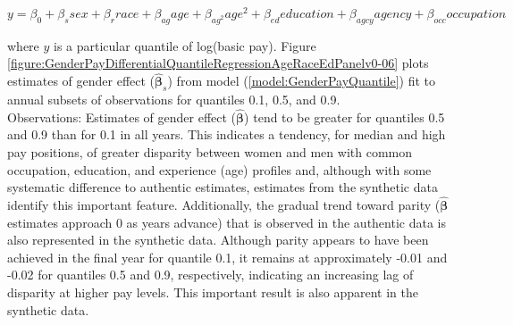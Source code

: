 \documentclass[10pt, letterpaper]{article}
\newcommand{\mest}[1]{\hat{\bm{#1}}}
\begin{document}
\begin{spacing}{1.0}
\begin{equation} y=\beta_0+\beta_ssex+\beta_rrace+\beta_{ag}age+\beta_{ag^2}age^2+\beta_{ed}education+\beta_{agcy}agency+\beta_{occ}occupation
\label{model:GenderPayQuantile}
\end{equation}

where $y$ is a particular quantile of log(basic pay).  Figure \ref{figure:GenderPayDifferentialQuantileRegressionAgeRaceEdPanelv0-06} plots estimates of gender effect ($\mest{\beta}_s$) from model (\ref{model:GenderPayQuantile}) fit to annual subsets of observations for quantiles 0.1, 0.5, and 0.9.\\

Observations:  Estimates of gender effect ($\mest{\beta}$) tend to be greater for quantiles 0.5 and 0.9 than for 0.1 in all years.  This indicates a tendency, for median and high pay positions, of greater disparity between women and men with common occupation, education, and experience (age) profiles and, although with some systematic difference to authentic estimates, estimates from the synthetic data identify this important feature.  Additionally, the gradual trend toward parity ($\mest{\beta}$ estimates approach 0 as years advance) that is observed in the authentic data is also represented in the synthetic data.  Although parity appears to have been achieved in the final year for quantile 0.1, it remains at approximately -0.01 and -0.02 for quantiles 0.5 and 0.9, respectively, indicating an increasing lag of disparity at higher pay levels.  This important result is also apparent in the synthetic data.


\end{spacing}
\end{document}
